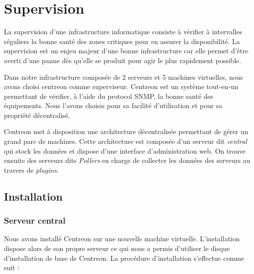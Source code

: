 \section{Supervision}

La supervision d'une infrastructure informatique consiste à vérifier à intervalles réguliers la bonne santé des zones critiques pour en assurer la disponibilité.
La supervision est un enjeu majeur d'une bonne infrastructure car elle permet d'être averti d'une panne dès qu'elle se produit pour agir le plus rapidement possible.

Dans notre infrastructure composée de 2 serveurs et 5 machines virtuelles, nous avons choisi centreon comme superviseur.
Centreon est un système tout-en-un permettant de vérifier, à l'aide du protocol SNMP, la bonne santé des équipements.
Nous l'avons choisis pour sa facilité d'utilisation et pour sa propriété décentralisé.

Centreon met à disposition une architecture décentralisée permettant de gérer un grand parc de machines.
Cette architecture est composée d'un serveur dit \emph{central} qui stock les données et dispose d'une interface d'administration web.
On trouve ensuite des serveurs dits \emph{Pollers} en charge de collecter les données des serveurs au travers de \emph{plugins}.

	\subsection{Installation}

	\subsubsection{Serveur central}

	Nous avons installé Centreon sur une nouvelle machine virtuelle.
	L'installation dispose alors de son propre serveur ce qui nous a permis d'utiliser le disque d'installation de base de Centreon.
	La procédure d'installation s'effectue comme suit :

